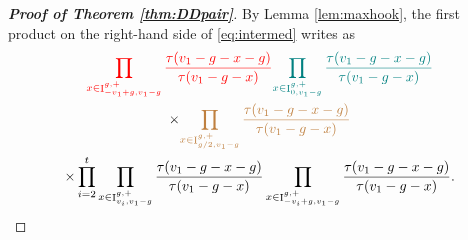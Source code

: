 \documentclass[11pt,letterpaper]{amsart}
\def\cch{\mathcal H}
\DeclareMathOperator{\I}{I}
\numberwithin{equation}{section}
\numberwithin{df}{section}
\begin{document}
\begin{proof}[\textbf{Proof of Theorem \ref{thm:DDpair}}]
By Lemma \ref{lem:maxhook}, the first product on the right-hand side of \eqref{eq:intermed} writes as
\begin{multline}\label{eq:telescoprod}
\textcolor{red}{\prod_{x \in\I_{-v_1+g,v_1-g}^{g,+}}\frac{\tau(v_1-g-x-g)}{\tau(v_1-g-x)}}\textcolor{teal}{\prod_{x \in\I_{0,v_1-g}^{g,+}}\frac{\tau(v_1-g-x-g)}{\tau(v_1-g-x)}}\\
\times\textcolor{brown}{\prod_{x \in\I_{g/2,v_1-g}^{g,+}}\frac{\tau(v_1-g-x-g)}{\tau(v_1-g-x)}}\\\times\prod_{i=2}^{t}\prod_{x \in\I_{v_i,v_1-g}^{g,+}}\frac{\tau(v_1-g-x-g)}{\tau(v_1-g-x)}\prod_{x \in\I_{-v_i+g,v_1-g}^{g,+}}\frac{\tau(v_1-g-x-g)}{\tau(v_1-g-x)}.
\end{multline}


\end{proof}
\end{document}
